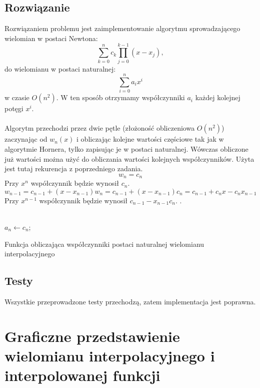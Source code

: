 \documentclass{article}
\begin{document}
\subsection{Rozwiązanie}
Rozwiązaniem problemu jest zaimplementowanie algorytmu sprowadzającego wielomian w postaci Newtona:
\[\sum_{k=0}^n c_k \prod_{j=0}^{k-1} (x-x_j),\]
do wielomianu w postaci naturalnej:
\[\sum_{i=0}^n a_ix^i\]
w czasie $O(n^2)$. W ten sposób otrzymamy współczynniki $a_i$ każdej kolejnej potęgi $x^i$.
\\ \\ Algorytm przechodzi przez dwie pętle (złożoność obliczeniowa $O(n^2)$) zaczynając od $w_n(x)$ i obliczając kolejne wartości częściowe tak jak w algorytmie Hornera, tylko zapisując je w postaci naturalnej. Wówczas obliczone już wartości można użyć do obliczania wartości kolejnych współczynników. Użyta jest tutaj rekurencja z poprzedniego zadania.
\[w_n = c_n \]
Przy $x^n$ współczynnik będzie wynosił $c_n$.
\[w_{n-1} = c_{n-1} + (x-x_{n-1})w_n = c_{n-1} + (x-x_{n-1})c_n = c_{n-1} + c_nx - c_nx_{n-1}\] 
Przy $x^{n-1}$ współczynnik będzie wynosił $c_{n-1} - x_{n-1}c_n$.
.
\\ \\ 
\begin{algorithm}[H]
\SetAlgoLined
{}
$a_n \gets c_n$;


\caption{Funkcja obliczająca współczynniki postaci naturalnej wielomianu interpolacyjnego}
\end{algorithm}
\subsection{Testy}
Wszystkie przeprowadzone testy przechodzą, zatem implementacja jest poprawna.

\section{Graficzne przedstawienie wielomianu interpolacyjnego
i interpolowanej funkcji}
\end{document}
